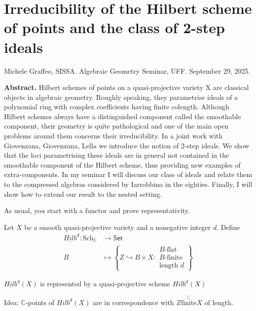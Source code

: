 \section{Irreducibility of the Hilbert scheme
of points and the class of 2-step
ideals}
\label{section-irred-hilbe-schem-point}

\noindent
Michele Graffeo, SISSA.
Algebraic Geometry Seminar, UFF.
September 29, 2025.

\medskip\noindent
{\bf Abstract.}
Hilbert schemes of points on a
quasi-projective variety X are classical
objects
in algebraic geometry. Roughly speaking, they
parametrise ideals of a polynomial
ring with complex coefficients having finite
colength. Although Hilbert schemes
always have a distinguished component called
the smoothable component, their
geometry is quite pathological and one of the
main open problems around them
concerns their irreducibility. In a joint
work with Giovenzana, Giovenzana,
Lella we introduce the notion of 2-step
ideals. We show that the loci
parametrising these ideals are in general not
contained in the smoothable
component of the Hilbert scheme, thus
providing new examples of
extra-components.  In my seminar I will
discuss our class of ideals and relate
them to the compressed algebras considered by
Iarrobbino in the eighties.
Finally, I will show how to extend our result
to the nested setting.


\medskip\noindent

As usual, you start with a functor and
prove representativity.

\begin{definition}
\label{definition-hilbert-scheme}
Let $X$ be a smooth
quasi-projective variety and a nonegative
integer $d$.
Define
$$
\begin{aligned}
\underline{Hilb}^d: \text{Sch}_\mathbb{C}
&\longrightarrow \mathsf{Set} \\
B &\longmapsto \left\{Z \hookrightarrow B
\times X:
\substack{B\text{-flat} \\ B\text{-finite}\\
\text{length }d}\right\}
\end{aligned}
$$
\end{definition}

\begin{theorem}[Grothendieck]
\label{theorem-grothendieck}
$\underline{Hilb}^d(X)$ is represented by a
quasi-projective
scheme $Hilb^d(X)$
\end{theorem}

Idea: $\mathbb{C}$-points of $Hilb^d(X)$
are in correspondence with $Z
\overset{\subset}{\text{finite}}X$
of length.

